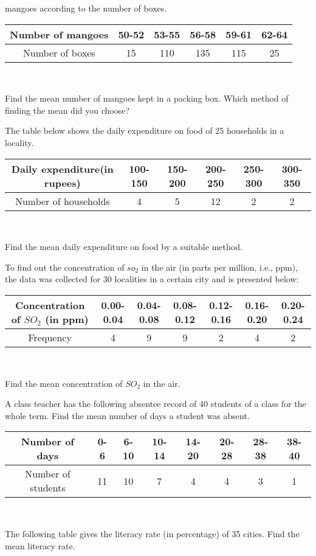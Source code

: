 mangoes according to the number of boxes.
\begin{tabular}{|c|c|c|c|c|c|}
\hline
Number of mangoes&50-52&53-55&56-58&59-61&62-64\\
\hline
Number of boxes&15&110&135&115&25\\
\hline
\end{tabular}\\
\par Find the mean number of mangoes kept in a packing box. Which method of finding
the mean did you choose?
\item The table below shows the daily expenditure on food of 25 households in a locality.
\begin{tabular}{|c|c|c|c|c|c|}
\hline
Daily expenditure(in rupees)&100-150&150-200&200-250&250-300&300-350 \\
\hline
Number of households&4&5&12&2&2\\
\hline
\end{tabular}\\
\par Find the mean daily expenditure on food by a suitable method.
\item To find out the concentration of $so_2$ in the air (in parts per million, i.e., ppm), the data was collected for 30 localities in a certain city and is presented below:
\begin{tabular}{|c|c|c|c|c|c|c|}
\hline
Concentration of $SO_2$ (in ppm)&0.00-0.04&0.04-0.08&0.08-0.12&0.12-0.16&0.16-0.20& 
0.20-0.24 \\
\hline
Frequency&4&9&9&2&4&2\\
\hline
\end{tabular}\\
\par Find the mean concentration of $SO_2$ in the air.
\item A class teacher has the following absentee record of 40 students of a class for the whole
term. Find the mean number of days a student was absent.
\begin{tabular}{|c|c|c|c|c|c|c|c|}
\hline
Number of days&0-6&6-10&10-14&14-20&20-28&28-38&38-40 \\
\hline
Number of students&11&10&7&4&4&3&1\\
\hline
\end{tabular}\\
\item The following table gives the literacy rate (in percentage) of 35 cities. Find the mean
literacy rate.
